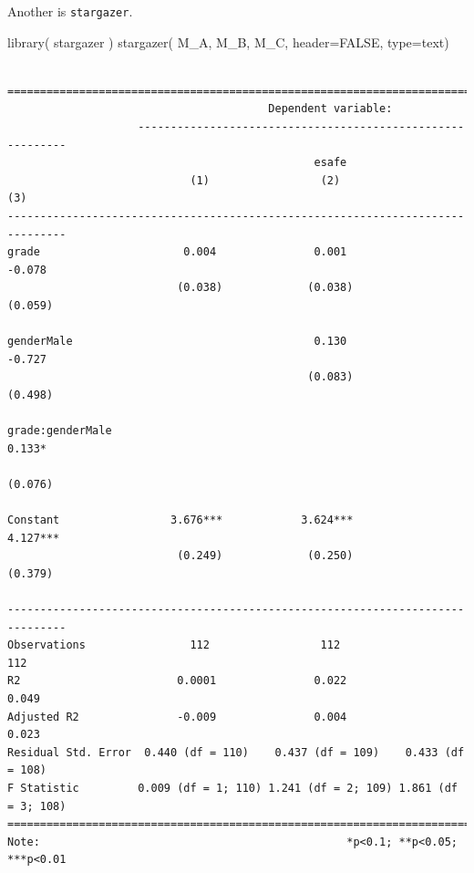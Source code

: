 \documentclass[
  letterpaper,
  DIV=11,
  numbers=noendperiod]{scrreprt}
\newenvironment{Shaded}{\begin{snugshade}}{\end{snugshade}}
\newcommand{\AttributeTok}[1]{\textcolor[rgb]{0.49,0.56,0.16}{#1}}
\newcommand{\ConstantTok}[1]{\textcolor[rgb]{0.53,0.00,0.00}{#1}}
\newcommand{\FunctionTok}[1]{\textcolor[rgb]{0.02,0.16,0.49}{#1}}
\newcommand{\NormalTok}[1]{\textcolor[rgb]{0.00,0.44,0.13}{#1}}
\newcommand{\StringTok}[1]{\textcolor[rgb]{0.25,0.44,0.63}{#1}}
\begin{document}
Another is \texttt{stargazer}.

\begin{Shaded}
\begin{Highlighting}[]
\FunctionTok{library}\NormalTok{( stargazer )}
\FunctionTok{stargazer}\NormalTok{( M\_A, M\_B, M\_C, }\AttributeTok{header=}\ConstantTok{FALSE}\NormalTok{, }\AttributeTok{type=}\StringTok{\textquotesingle{}text\textquotesingle{}}\NormalTok{)}
\end{Highlighting}
\end{Shaded}

\begin{verbatim}

===============================================================================
                                        Dependent variable:                    
                    -----------------------------------------------------------
                                               esafe                           
                            (1)                 (2)                 (3)        
-------------------------------------------------------------------------------
grade                      0.004               0.001              -0.078       
                          (0.038)             (0.038)             (0.059)      
                                                                               
genderMale                                     0.130              -0.727       
                                              (0.083)             (0.498)      
                                                                               
grade:genderMale                                                  0.133*       
                                                                  (0.076)      
                                                                               
Constant                 3.676***            3.624***            4.127***      
                          (0.249)             (0.250)             (0.379)      
                                                                               
-------------------------------------------------------------------------------
Observations                112                 112                 112        
R2                        0.0001               0.022               0.049       
Adjusted R2               -0.009               0.004               0.023       
Residual Std. Error  0.440 (df = 110)    0.437 (df = 109)    0.433 (df = 108)  
F Statistic         0.009 (df = 1; 110) 1.241 (df = 2; 109) 1.861 (df = 3; 108)
===============================================================================
Note:                                               *p<0.1; **p<0.05; ***p<0.01
\end{verbatim}
\end{document}
